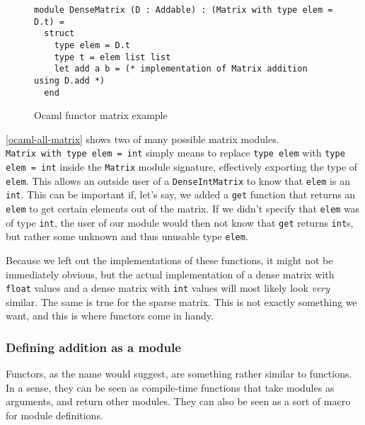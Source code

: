 \begin{figure*}
\begin{verbatim}
module DenseMatrix (D : Addable) : (Matrix with type elem = D.t) =
  struct
    type elem = D.t
    type t = elem list list
    let add a b = (* implementation of Matrix addition using D.add *)
  end
\end{verbatim}
\caption{Ocaml functor matrix example}
\label{ocaml-matrix-functor}
\end{figure*}

\autoref{ocaml-all-matrix} shows two of many possible matrix modules. \\ \verb|Matrix with type elem = int| simply means to replace \verb|type elem| with \verb|type elem = int| inside the \verb|Matrix| module signature, effectively exporting the type of \verb|elem|. This allows an outside user of a \verb|DenseIntMatrix| to know that \verb|elem| is an \verb|int|. This can be important if, let's say, we added a \verb|get| function that returns an \verb|elem| to get certain elements out of the matrix. If we didn't specify that \verb|elem| was of type \verb|int|, the user of our module would then not know that \verb|get| returns \verb|int|s, but rather some unknown and thus unusable type \verb|elem|.

Because we left out the implementations of these functions, it might not be immediately obvious, but the actual implementation of a dense matrix with \verb|float| values and a dense matrix with \verb|int| values will most likely look \textit{very} similar. The same is true for the sparse matrix. This is not exactly something we want, and this is where functors come in handy.

\subsubsection{Defining addition as a module}

Functors, as the name would suggest, are something rather similar to functions. In a sense, they can be seen as compile-time functions that take modules as arguments, and return other modules. They can also be seen as a sort of macro for module definitions.

